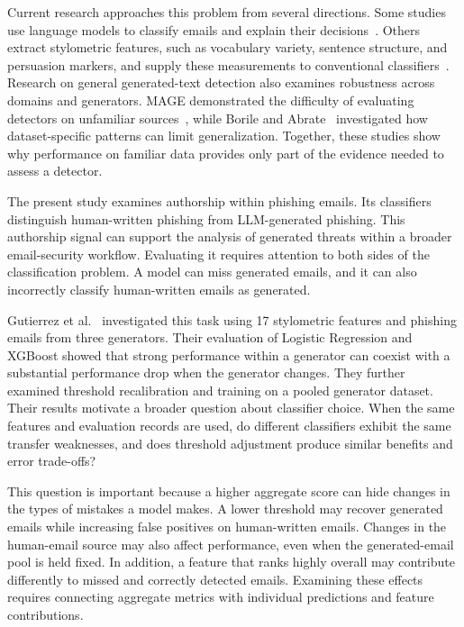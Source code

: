 \documentclass[conference]{IEEEtran}
\begin{document}
Current research approaches this problem from several directions.
Some studies use language models to classify emails and explain
their decisions~\cite{koide2026}. Others extract stylometric features,
such as vocabulary variety, sentence structure, and persuasion
markers, and supply these measurements to conventional
classifiers~\cite{opara2025}. Research on general generated-text
detection also examines robustness across domains and generators.
MAGE demonstrated the difficulty of evaluating detectors on
unfamiliar sources~\cite{li2024mage}, while Borile and
Abrate~\cite{borile2025} investigated how dataset-specific patterns
can limit generalization. Together, these studies show why performance
on familiar data provides only part of the evidence needed to assess
a detector.

The present study examines authorship within phishing emails.
Its classifiers distinguish human-written phishing from
LLM-generated phishing. This authorship signal can support the
analysis of generated threats within a broader email-security
workflow. Evaluating it requires attention to both sides of the
classification problem. A model can miss generated emails, and it
can also incorrectly classify human-written emails as generated.

Gutierrez et al.~\cite{gutierrez2026} investigated this task using
17 stylometric features and phishing emails from three generators.
Their evaluation of Logistic Regression and XGBoost showed that
strong performance within a generator can coexist with a substantial
performance drop when the generator changes. They further examined
threshold recalibration and training on a pooled generator dataset.
Their results motivate a broader question about classifier choice.
When the same features and evaluation records are used, do different
classifiers exhibit the same transfer weaknesses, and does threshold
adjustment produce similar benefits and error trade-offs?

This question is important because a higher aggregate score can
hide changes in the types of mistakes a model makes. A lower
threshold may recover generated emails while increasing false
positives on human-written emails. Changes in the human-email
source may also affect performance, even when the generated-email
pool is held fixed. In addition, a feature that ranks highly overall
may contribute differently to missed and correctly detected emails.
Examining these effects requires connecting aggregate metrics with
individual predictions and feature contributions.
\end{document}
